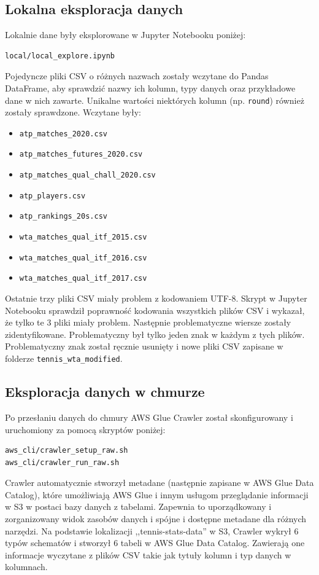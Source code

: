 \documentclass[12pt, a4paper]{article}
\begin{document}
\subsection{Lokalna eksploracja danych}
Lokalnie dane były eksplorowane w Jupyter Notebooku poniżej:
\begin{verbatim}
local/local_explore.ipynb
\end{verbatim}
Pojedyncze pliki CSV o różnych nazwach zostały wczytane do Pandas DataFrame, aby sprawdzić nazwy ich kolumn, typy danych oraz przykładowe dane w nich zawarte. Unikalne wartości niektórych kolumn (np. \lstinline[style=verbatimStyle]{round}) również zostały sprawdzone. Wczytane były:
\begin{itemize}
    \item \lstinline[style=verbatimStyle]{atp_matches_2020.csv}
    \item \lstinline[style=verbatimStyle]{atp_matches_futures_2020.csv}
    \item \lstinline[style=verbatimStyle]{atp_matches_qual_chall_2020.csv}
    \item \lstinline[style=verbatimStyle]{atp_players.csv}
    \item \lstinline[style=verbatimStyle]{atp_rankings_20s.csv}
    \item \lstinline[style=verbatimStyle]{wta_matches_qual_itf_2015.csv}
    \item \lstinline[style=verbatimStyle]{wta_matches_qual_itf_2016.csv}
    \item \lstinline[style=verbatimStyle]{wta_matches_qual_itf_2017.csv}
\end{itemize}
Ostatnie trzy pliki CSV miały problem z kodowaniem UTF-8. Skrypt w Jupyter Notebooku sprawdził poprawność kodowania wszystkich plików CSV i wykazał, że tylko te 3 pliki miały problem. Następnie problematyczne wiersze zostały zidentyfikowane. Problematyczny był tylko jeden znak w każdym z tych plików. Problematyczny znak został ręcznie usunięty i nowe pliki CSV zapisane w folderze \lstinline[style=verbatimStyle]{tennis_wta_modified}.

\subsection{Eksploracja danych w chmurze}
Po przesłaniu danych do chmury AWS Glue Crawler został skonfigurowany i uruchomiony za pomocą skryptów poniżej:
\begin{verbatim}
aws_cli/crawler_setup_raw.sh
aws_cli/crawler_run_raw.sh
\end{verbatim}
Crawler automatycznie stworzył metadane (następnie zapisane w AWS Glue Data Catalog), które umożliwiają AWS Glue i innym usługom przeglądanie informacji w S3 w postaci bazy danych z tabelami. Zapewnia to uporządkowany i zorganizowany widok zasobów danych i spójne i dostępne metadane dla różnych narzędzi. Na podstawie lokalizacji ,,tennis-stats-data'' w S3, Crawler wykrył 6 typów schematów i stworzył 6 tabeli w AWS Glue Data Catalog. Zawierają one informacje wyczytane z plików CSV takie jak tytuły kolumn i typ danych w kolumnach.
\end{document}
